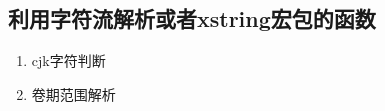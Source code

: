 \subsection{利用字符流解析或者xstring宏包的函数}\label{sec:cjkjudge}
\begin{enumerate}
\item cjk字符判断
\begin{texlist}
\def\testCJKfirstchar#1#2&{%
\ifnumgreater{`#1}{"2E7F}{\toggletrue{ifCJKforgbt}}{\togglefalse{ifCJKforgbt}}%
}%

\def\testCJKfirst#1{%
\exploregroups%
\StrChar{#1}{1}[\tempa]%
\expandafter\testCJKfirstchar\tempa&}
\end{texlist}

\item 卷期范围解析
\begin{texlist}
\newcommand{\multivolparser}[1]{%
    \IfSubStr{#1}{-}%
        {\StrBefore{#1}{-}[\multivolfirst]\StrBehind{#1}{-}[\multivolsecond]}%
        {\def\multivolfirst{#1}\def\multivolsecond{}}%
}

\newcommand{\multinumberparser}[1]{%
    \IfSubStr{#1}{-}%
        {\StrBefore{#1}{-}[\multinumberfirst]\StrBehind{#1}{-}[\multinumbersecond]}%
        {\def\multinumberfirst{#1}\def\multinumbersecond{}}%
}



\end{texlist}
\end{enumerate}
